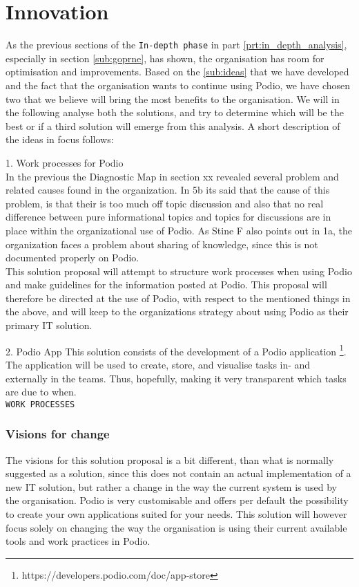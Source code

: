\part{Innovation}
As the previous sections of the \texttt{In-depth phase} in part \ref{prt:in_depth_analysis},
especially in section \ref{sub:goprne}, has shown,
the organisation has room for optimisation and improvements. Based on the \ref{sub:ideas} that we
have developed and the fact that the organisation wants to continue using Podio, we have chosen two that we believe will bring the most benefits to the organisation.
We will in the following analyse both the solutions, and try to determine which will be the best or
if a third solution will emerge from this analysis. A short description of the ideas in focus
follows:


1. Work processes for Podio\\
In the previous the Diagnostic Map in section xx revealed several problem and related causes found in the organization. In 5b its said that the cause of this problem, is that their is too much off topic discussion and also that no real difference between pure informational topics and topics for discussions are in place within the organizational use of Podio. As Stine F also points out in 1a, the organization faces a problem about sharing of knowledge, since this is not documented properly on Podio.\\

This solution proposal will attempt to structure work processes when using Podio and make guidelines for the information posted at Podio. This proposal will therefore be directed at the use of Podio, with respect to the mentioned things in the above, and will keep to the organizations strategy about using Podio as their primary IT solution. 

2. Podio App
This solution consists of the development of a Podio application \footnote{https://developers.podio.com/doc/app-store}.
The application will be used to create, store, and visualise tasks in- and externally in the teams.
Thus, hopefully, making it very transparent which tasks are due to when.\\

\texttt{WORK PROCESSES}
\section{Visions for change}
The visions for this solution proposal is a bit different, than what is normally suggested as a
solution, since this does not contain an actual implementation of a new IT solution, but rather a
change in the way the current system is used by the organisation.
Podio is very customisable and offers per default the possibility to create your own applications
suited for your needs. This solution will however focus solely on changing the way the organisation
is using their current available tools and work practices in Podio.


